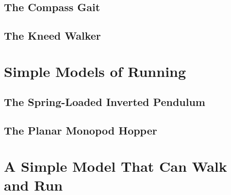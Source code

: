 \subsection{The Compass Gait}
\subsection{The Kneed Walker}


\section{Simple Models of Running}
\subsection{The Spring-Loaded Inverted Pendulum}
\subsection{The Planar Monopod Hopper}


\section{A Simple Model That Can Walk and Run}